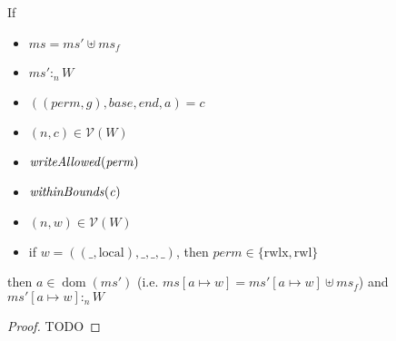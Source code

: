 \documentclass[a4paper]{article}
\newcommand{\update}[2]{[#1 \mapsto #2]}
\DeclareMathOperator{\dom}{dom}
\newcommand{\var}[1]{\mathit{#1}}
\newcommand{\hs}{\var{ms}}
\newcommand{\ms}{\hs}
\newcommand{\gl}{\var{g}}
\newcommand{\addr}{\var{a}}
\newcommand{\start}{\var{base}}
\newcommand{\addrend}{\var{end}}
\newcommand{\heap}{\var{mem}}
\newcommand{\perm}{\var{perm}}
\newcommand{\plainfun}[2]{
  \ifthenelse{\equal{#2}{}}
  {\mathit{#1}}
  {\mathit{#1}(#2)}
}
\newcommand{\writeAllowed}[1]{\plainfun{writeAllowed}{#1}}
\newcommand{\withinBounds}[1]{\plainfun{withinBounds}{#1}}
\newcommand{\heapSat}[3][\heap]{#1 :_{#2} #3}
\newcommand{\asmType}{\plaindom{AsmType}}
\newcommand{\plaindom}[1]{\mathrm{#1}}
\newcommand{\intr}[2]{\mathcal{#1}}
\newcommand{\valueintr}[1]{\intr{V}{#1}}
\newcommand{\stdvr}{\valueintr{\asmType}}
\newcommand{\npair}[2][n]{\left(#1,#2 \right)}
\newcommand{\plainperm}[1]{\mathrm{#1}}
\newcommand{\readwritel}{\plainperm{rwl}}
\newcommand{\rwlx}{\plainperm{rwlx}}
\newcommand{\local}{\plainperm{local}}
\begin{document}
 
 \begin{lemma}
   \label{lem:conds-store-suff}
   If 
   \begin{itemize}
   \item $\ms = \ms' \uplus \ms_f$
   \item $\heapSat[\ms']{n}{W}$
   \item $((\perm,\gl),\start,\addrend,\addr) = c$
   \item $\npair{c}\in\stdvr(W)$
   \item $\writeAllowed{\perm}$
   \item $\withinBounds{\var{c}}$
   \item $\npair{\var{w}}\in\stdvr(W)$
   \item if $\var{w} = ((\_,\local),\_,\_,\_)$, then $\perm \in
     \{\rwlx,\readwritel \}$
   \end{itemize}
 
   then $\addr \in \dom(\ms')$ (i.e. $\ms\update{a}{w} =
   \ms'\update{a}{w}\uplus\ms_f$) and
   $\heapSat[{\ms'\update{\addr}{\var{w}}}]{n}{W}$
 \end{lemma}
 \begin{proof}
   TODO
 \end{proof}
  
\end{document}
